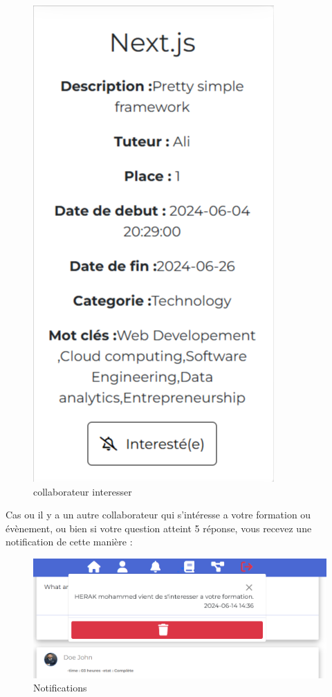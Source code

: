\documentclass{article}
\begin{document}
\begin{figure}[h!]
\begin{minipage}{0.45\textwidth}
                        \includegraphics[width=0.8\linewidth]{assets/webSite/interested.png}
                        \caption{collaborateur interesser}
                    \end{minipage}
                \end{figure}
                \FloatBarrier

                Cas ou il y a un autre collaborateur qui s'intéresse a votre formation ou évènement, ou bien si votre question atteint 5 réponse, vous recevez une notification de cette manière : 
                \begin{figure}[h!]
                    \centering
                    \includegraphics[width=0.5\linewidth]{assets//webSite/notification.png}
                    \caption{Notifications}
                \end{figure}
                \FloatBarrier
                \newpage
\end{document}

